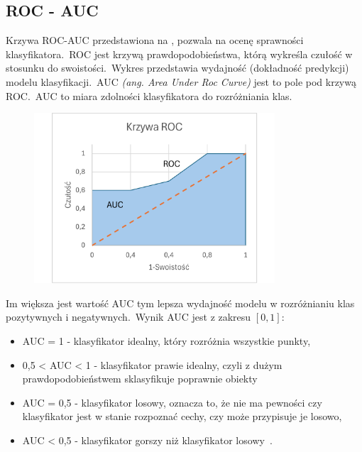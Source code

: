 \subsection{ROC - AUC}
Krzywa ROC-AUC przedstawiona na , pozwala na ocenę sprawności klasyfikatora.\ ROC jest krzywą prawdopodobieństwa, którą wykreśla czułość w stosunku do swoistości.\ Wykres przedstawia wydajność (dokładność predykcji) modelu klasyfikacji.\ AUC \textit{(ang. Area Under Roc Curve)} jest to pole pod krzywą ROC.\ AUC to miara zdolności klasyfikatora do rozróżniania klas.

\begin{figure}[H]
    \centering
    \includegraphics[width=0.8\textwidth]{images/roc-auc}
    \label{fig:roc-auc}
\end{figure}

Im większa jest wartość AUC tym lepsza wydajność modelu w rozróżnianiu klas pozytywnych i negatywnych.\ Wynik AUC jest z zakresu $[0, 1]$:
\begin{itemize}
    \item AUC = 1 - klasyfikator idealny, który rozróżnia wszystkie punkty,
    \item 0,5 < AUC < 1 - klasyfikator prawie idealny, czyli z dużym prawdopodobieństwem sklasyfikuje poprawnie obiekty
    \item AUC = 0,5 - klasyfikator losowy, oznacza to, że nie ma pewności czy klasyfikator jest w stanie rozpoznać cechy, czy może przypisuje je losowo,
    \item AUC < 0,5 - klasyfikator gorszy niż klasyfikator losowy~\cite{Algolytics, Agrawal2024}.
\end{itemize}